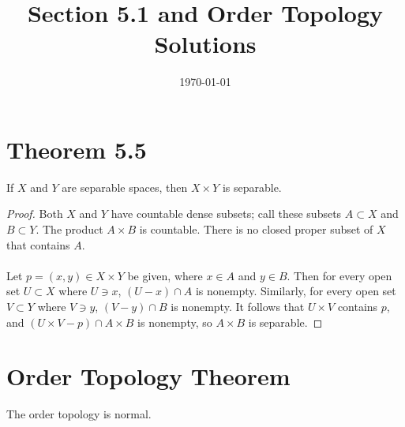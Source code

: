 \documentclass{article}
\title{\textbf{Section 5.1 and Order Topology Solutions}}
\date{}
\date\today
\begin{document}
\maketitle %

\thispagestyle{firstpage}
\section*{Theorem 5.5}

If $X$ and $Y$ are separable spaces, then $X \times Y$ is separable.

\begin{proof}
Both $X$ and $Y$ have countable dense subsets; call these subsets $A \subset X$ and $B \subset Y$.  
The product $A \times B$ is countable.  There is no closed proper subset of $X$ that contains $A$.  \\
\\
Let $p = (x, y) \in X \times Y$ be given, where $x \in A$ and $y \in B$.  Then for every open set 
$U \subset X$ where $U \ni x$, $(U - x) \cap A$ is nonempty.  Similarly, for every open set 
$V \subset Y$ where $V \ni y$, $(V - y) \cap B$ is nonempty.  It follows that $U \times V$ 
contains $p$, and $(U \times V - p) \cap A \times B$ is nonempty, so $A \times B$ is separable.


\end{proof}

\section*{Order Topology Theorem} 

The order topology is normal.
\end{document}
